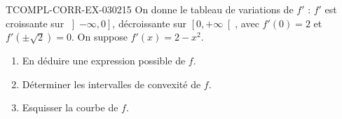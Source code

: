 \begin{exercice}{TCOMPL-CORR-EX-030}{2}{15}
On donne le tableau de variations de $f'$ : $f'$ est croissante sur $\left]-\infty, 0\right]$, décroissante sur $\left[0, +\infty\right[$, avec $f'(0) = 2$ et $f'(\pm\sqrt{2}) = 0$. On suppose $f'(x) = 2 - x^2$.
\begin{enumerate}
  \item En déduire une expression possible de $f$.
  \item Déterminer les intervalles de convexité de $f$.
  \item Esquisser la courbe de $f$.
\end{enumerate}

\end{exercice}
